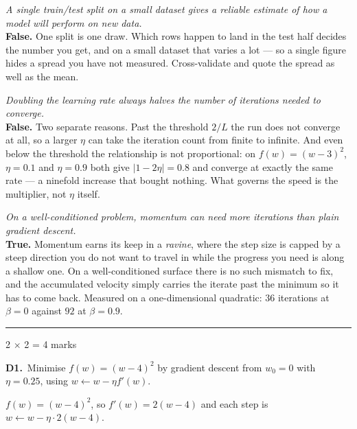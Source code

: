 \documentclass[10pt,a4paper]{article}
\newcommand{\parthead}[2]{\vspace{2pt}\noindent\rule{\linewidth}{0.4pt}\par\vspace{2pt}%
  \noindent{\bfseries Part #1}\hfill{\small #2}\par\vspace{1pt}}
\begin{document}
\begin{sC}

  \item \emph{A single train/test split on a small dataset gives a reliable estimate of how a model will perform on new data.}\\[2pt] \textbf{False.} One split is one draw. Which rows happen to land in the test half decides the number you get, and on a small dataset that varies a lot --- so a single figure hides a spread you have not measured. Cross-validate and quote the spread as well as the mean.

  \item \emph{Doubling the learning rate always halves the number of iterations needed to converge.}\\[2pt] \textbf{False.} Two separate reasons. Past the threshold $2/L$ the run does not converge at all, so a larger $\eta$ can take the iteration count from finite to infinite. And even below the threshold the relationship is not proportional: on $f(w) = (w-3)^2$, $\eta = 0.1$ and $\eta = 0.9$ both give $\lvert 1 - 2\eta \rvert = 0.8$ and converge at exactly the same rate --- a ninefold increase that bought nothing. What governs the speed is the multiplier, not $\eta$ itself.

  \item \emph{On a well-conditioned problem, momentum can need \emph{more} iterations than plain gradient descent.}\\[2pt] \textbf{True.} Momentum earns its keep in a \emph{ravine}, where the step size is capped by a steep direction you do not want to travel in while the progress you need is along a shallow one. On a well-conditioned surface there is no such mismatch to fix, and the accumulated velocity simply carries the iterate past the minimum so it has to come back. Measured on a one-dimensional quadratic: $36$ iterations at $\beta = 0$ against $92$ at $\beta = 0.9$.

\end{sC}

\newpage

\parthead{D --- Short answer}{2 $\times$ 2 = 4 marks}

\textbf{D1.}\ Minimise $f(w) = (w-4)^2$ by gradient descent from $w_0 = 0$ with $\eta = 0.25$, using $w \leftarrow w - \eta f'(w)$.

\vspace{2pt}

$f(w) = (w-4)^2$, so $f'(w) = 2(w-4)$ and each step is $w \leftarrow w - \eta \cdot 2(w-4)$.
\end{document}
